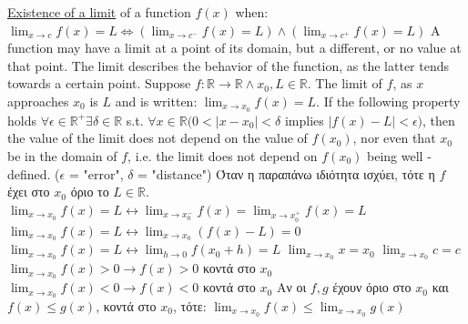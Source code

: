 \documentclass[12pt]{article}
\begin{document}
\begin{flushleft}
	\textbullet \quad \uline{Existence of a limit} of a function $f(x)$ when: \linebreak 
	$\displaystyle \lim_{x\to c} f(x) = L \Leftrightarrow \left( \lim_{x\to c^-} f(x) = L \right) \land \left( \lim_{x\to c^+} f(x) = L \right) $ \linebreak 
	A function may have a limit at a point of its domain, but a different, or no value at that point. The limit describes the behavior of the function, as the latter tends towards a certain point. \linebreak 
	\textbullet \quad Suppose $\displaystyle f: \mathbb{R} \rightarrow \mathbb{R} \land x_0, L \in \mathbb{R}$. The limit of $f$, as $x$ approaches $x_0$ is $L$ and is written: $\displaystyle \lim_{x\to x_0} f(x) = L$. \linebreak 
	\textbullet \quad If the following property holds $\displaystyle \forall \epsilon \in \mathbb{R}^+ \exists \delta \in \mathbb{R}$ s.t. $\forall x \in \mathbb{R}( 0 < |x-x_0| < \delta $ implies $|f(x) -L| < \epsilon )$, then the value of the limit does not depend on the value of $f(x_0)$, nor even that $x_0$ be in the domain of $f$, i.e. the limit does not depend on $f(x_0)$ being well - defined. ($\epsilon$ = "error", $\delta$ = "distance") \linebreak \textgreek{Όταν η παραπάνω ιδιότητα ισχύει, τότε η} $f$ \textgreek{έχει στο} $x_0$ \textgreek{όριο το} $L \in \mathbb{R}$. \linebreak 
	\textbullet \quad $\displaystyle \lim_{x\to x_0} f(x) = L \leftrightarrow \lim_{x\to x_0^-} f(x) = \lim_{x\to x_0^+} f(x) = L $ \linebreak 
	\textbullet \quad $\displaystyle \lim_{x\to x_0} f(x) = L \leftrightarrow \lim_{x\to x_0} (f(x) - L) = 0 $ \linebreak 
	\textbullet \quad $\displaystyle \lim_{x\to x_0} f(x) = L \leftrightarrow \lim_{h\to 0} f(x_0 + h) = L $ \linebreak 
	\textbullet \quad $\displaystyle \lim_{x\to x_0} x = x_0$ \linebreak 
	\textbullet \quad $\displaystyle \lim_{x\to x_0} c = c$ \linebreak 
	\textbullet \quad $\displaystyle \lim_{x\to x_0} f(x) > 0 \rightarrow f(x) > 0 $ \textgreek{κοντά στο} $x_0$ \linebreak 
	\textbullet \quad $\displaystyle \lim_{x\to x_0} f(x) < 0 \rightarrow f(x) < 0 $ \textgreek{κοντά στο} $x_0$ \linebreak 
	\textbullet \quad \textgreek{Αν οι} $f,g$ \textgreek{έχουν όριο στο} $x_0$ \textgreek{και} $f(x) \leq g(x)$, \textgreek{κοντά στο} $x_0$, \textgreek{τότε}: $\displaystyle \lim_{x\to x_0} f(x) \leq \lim_{x\to x_0} g(x) $ \linebreak 

\end{flushleft}
\end{document}
